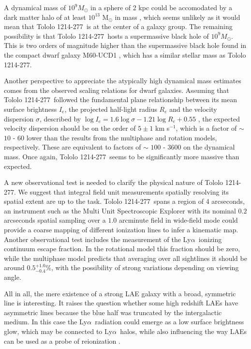 \documentclass[a4paper, usenatbib, 12pt]{article}
\newcommand{\tol}{Tololo 1214-277}
\newcommand{\lya}{Ly$\alpha$}
\newcommand{\kms}{km s$^{-1}$}
\begin{document}
{A dynamical mass of $10^{9} M_{\odot}$ in a sphere of 2 kpc could be
accomodated by a dark matter halo of at least $10^{13}$
M$_{\odot}$ in mass \cite{2011ApJ...726..108T}, which
seems unlikely as it would mean that  \tol\ is at the center of a
galaxy group.
The remaining possibility is that \tol\ hosts a supermassive black hole of
$10^{9} M_{\odot}$. This is two orders of magnitude higher
than the supermassive black hole found in the compact dwarf galaxy
M60-UCD1 \cite{2014Natur.513..398S}, which has a similar stellar mass
as \tol.


Another perspective to appreciate the atypically high dynamical mass
estimates comes from the observed scaling relations for dwarf
galaxies.
Assuming that \tol\ followed the fundamental plane relationship
between its mean surface brightness $I_e$, the projected half-light
radius $R_e$ and the velocity dispersion $\sigma$, described by $\log
I_e=1.6 \log\sigma - 1.21\log R_e + 0.55$ \cite{2009ApJ...698.1590G},
the expected velocity dispersion should be on the order of $5 \pm 1$ 
\kms, which is a factor of $\sim$ $10$ - $60$ lower than the 
results from the multiphase and rotation models, respectively. 
These are equivalent to factors of $\sim$ $100$ - $3600$ on the
dynamical mass.
Once again,  \tol\ seems to be significantly more massive than
expected. 




A new observational test is needed to clarify the physical nature of
\tol. 
We suggest that integral field unit measurements spatially
resolving its spatial extent are up to the task. 
\tol\ spans a region of $4$ arcseconds,
an instrument such as the Multi Unit Spectroscopic Explorer
\cite{2014Msngr.157...13B} with its
nominal $0.2$ arcseconds spatial sampling over a $1.0$ arcminute field
in wide-field mode could provide a coarse mapping of different
ionization lines to infer a kinematic map.
Another observational test includes the measurement of the
\lya\ ionizing continuum escape fraction.
In the rotational model this fraction should be zero, while
the multiphase model predicts that averaging over all sightlines
it should be around $0.5^{+1.0}_{-0.4}$\%, with the possibility of strong
variations depending on viewing angle. 

All in all, the mere existence of a strong LAE galaxy with a broad,
symmetric line is interesting.
It raises the question whether some high redshift LAEs have asymmetric
lines because the blue half was truncated by the intergalactic medium.
In this case the \lya\ radiation could emerge as a low surface
brightness glow, which may be connected to \lya\ halos, while also
influencing the way LAEs can be used as a probe of reionization
\cite{2014PASA...31...40D}.  

}
\end{document}
